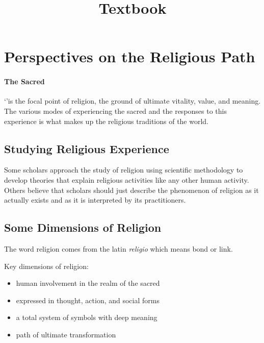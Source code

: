 \documentclass{article}
\begin{document}
\title{Textbook}
\maketitle
\section{Perspectives on the Religious Path}
\label{sec:perspectives_on_the_religious_path}

\paragraph{The Sacred}
`'is the focal point of religion, the ground of ultimate vitality, value, and meaning. The various modes of experiencing the sacred and the responses to this experience is what makes up the religious traditions of the world.

\subsection{Studying Religious Experience}
\label{sub:studying_religious_experience}
Some scholars approach the study of religion using scientific methodology to develop theories that explain religious activities like any other human activity. Others believe that scholars should just describe the phenomenon of religion as it actually exists and as it is interpreted by its practitioners.

\subsection{Some Dimensions of Religion}
\label{sub:some_dimensions_of_religion}
The word religion comes from the latin \emph{religio} which means bond or link.

Key dimensions of religion:
\begin{itemize}
	\item human involvement in the realm of the sacred
	\item expressed in thought, action, and social forms
	\item a total system of symbols with deep meaning
	\item path of ultimate transformation
\end{itemize}
\end{document}

